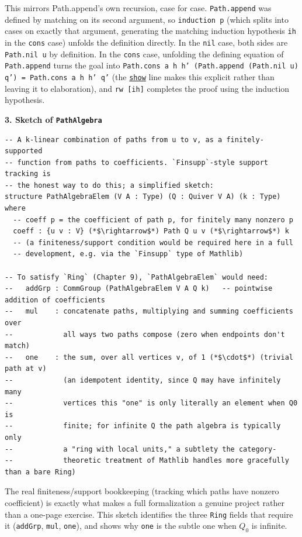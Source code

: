 This mirrors Path.append's own recursion, case for case. \texttt{Path.append} was defined by matching on its second argument, so \texttt{induction p} (which splits into cases on exactly that argument, generating the matching induction hypothesis \texttt{ih} in the \texttt{cons} case) unfolds the definition directly. In the \texttt{nil} case, both sides are \texttt{Path.nil u} by definition. In the \texttt{cons} case, unfolding the defining equation of \texttt{Path.append} turns the goal into \texttt{Path.cons a h h' (Path.append (Path.nil u) q') = Path.cons a h h' q'} (the \href{https://lean-lang.org/doc/reference/latest/Tactic-Proofs/Tactic-Reference/}{\texttt{show}} line makes this explicit rather than leaving it to elaboration), and \texttt{rw [ih]} completes the proof using the induction hypothesis.

\textbf{3. Sketch of \texttt{PathAlgebra}}

\begin{lstlisting}
-- A k-linear combination of paths from u to v, as a finitely-supported
-- function from paths to coefficients. `Finsupp`-style support tracking is
-- the honest way to do this; a simplified sketch:
structure PathAlgebraElem (V A : Type) (Q : Quiver V A) (k : Type) where
  -- coeff p = the coefficient of path p, for finitely many nonzero p
  coeff : {u v : V} (*$\rightarrow$*) Path Q u v (*$\rightarrow$*) k
  -- (a finiteness/support condition would be required here in a full
  -- development, e.g. via the `Finsupp` type of Mathlib)

-- To satisfy `Ring` (Chapter 9), `PathAlgebraElem` would need:
--   addGrp : CommGroup (PathAlgebraElem V A Q k)   -- pointwise addition of coefficients
--   mul    : concatenate paths, multiplying and summing coefficients over
--            all ways two paths compose (zero when endpoints don't match)
--   one    : the sum, over all vertices v, of 1 (*$\cdot$*) (trivial path at v)
--            (an idempotent identity, since Q may have infinitely many
--            vertices this "one" is only literally an element when Q0 is
--            finite; for infinite Q the path algebra is typically only
--            a "ring with local units," a subtlety the category-
--            theoretic treatment of Mathlib handles more gracefully than a bare Ring)
\end{lstlisting}

The real finiteness/support bookkeeping (tracking which paths have nonzero coefficient) is exactly what makes a full formalization a genuine project rather than a one-page exercise. This sketch identifies the three \texttt{Ring} fields that require it (\texttt{addGrp}, \texttt{mul}, \texttt{one}), and shows why \texttt{one} is the subtle one when \(Q_0\) is infinite.

